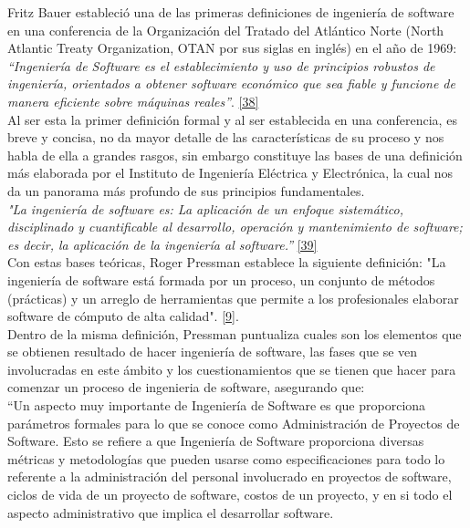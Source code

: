Fritz Bauer estableció una de las primeras definiciones de ingeniería de software en una conferencia de la Organización del Tratado del Atlántico Norte (North Atlantic Treaty Organization, OTAN por sus siglas en inglés) en el año de 1969: \textit {“Ingeniería de Software es el establecimiento y uso de principios robustos de ingeniería, orientados a obtener software económico que sea fiable y funcione de manera eficiente sobre máquinas reales”}. \hyperlink{b38}{[38]}\\
	
Al ser esta la primer definición formal y al ser establecida en una conferencia, es breve y concisa, no da mayor detalle de las características de su proceso y nos habla de ella a grandes rasgos, sin embargo constituye las bases de una definición más elaborada por el Instituto de Ingeniería Eléctrica y Electrónica, la cual nos da un panorama más profundo de sus principios fundamentales. \\

\textit {"La ingeniería de software es: La aplicación de un enfoque sistemático, disciplinado y cuantificable al desarrollo, operación y mantenimiento de software; es decir, la aplicación de la ingeniería al software.”}  \hyperlink{b39}{[39]}\\

Con estas bases teóricas, Roger Pressman establece la siguiente definición: "La ingeniería de software está formada por un proceso, un conjunto de métodos (prácticas) y un arreglo de herramientas que permite a los profesionales elaborar software de cómputo de alta calidad".  \hyperlink{b09}{[9]}. \\

Dentro de la misma definición, Pressman puntualiza cuales son los elementos que se obtienen resultado de hacer ingeniería de software, las fases que se ven involucradas en este ámbito y los cuestionamientos que se tienen que hacer para comenzar un proceso de ingenieria de software, asegurando que:\\

``Un aspecto muy importante de Ingeniería de Software es que proporciona parámetros formales para lo que se conoce como Administración de Proyectos de Software. Esto se refiere a que Ingeniería de Software proporciona diversas métricas y metodologías que pueden usarse como especificaciones para todo lo referente a la administración del personal involucrado en proyectos de software, ciclos de vida de un proyecto de software, costos de un proyecto, y en si todo el aspecto administrativo que implica el desarrollar software.

